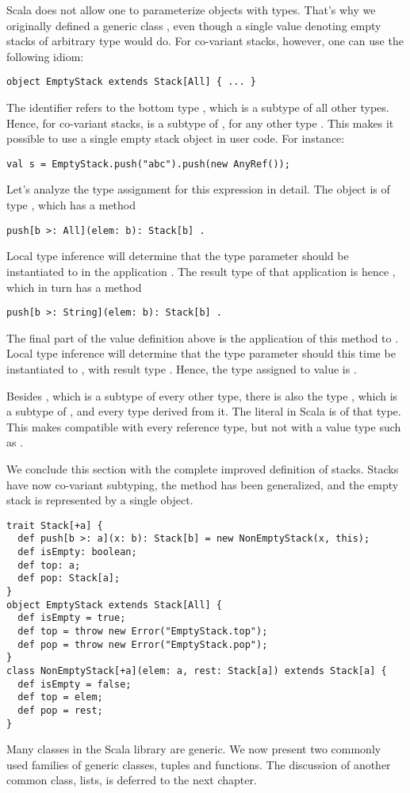 Scala does not allow one to parameterize objects with types. That's
why we originally defined a generic class , even
though a single value denoting empty stacks of arbitrary type would
do. For co-variant stacks, however, one can use the following idiom:
\begin{lstlisting}
object EmptyStack extends Stack[All] { ... }
\end{lstlisting}
The identifier  refers to the bottom type ,
which is a subtype of all other types. Hence, for co-variant stacks,
 is a subtype of , for any other type
. This makes it possible to use a single empty stack object
in user code. For instance:
\begin{lstlisting}
val s = EmptyStack.push("abc").push(new AnyRef());
\end{lstlisting}
Let's analyze the type assignment for this expression in detail.  The
 object is of type , which has a
method
\begin{lstlisting}
push[b >: All](elem: b): Stack[b] .
\end{lstlisting}
Local type inference will determine that the type parameter 
should be instantiated to  in the application 
. The result type of that application is hence
, which in turn has a method
\begin{lstlisting}
push[b >: String](elem: b): Stack[b] .
\end{lstlisting}
The final part of the value definition above is the application of
this method to . Local type inference will
determine that the type parameter  should this time be
instantiated to , with result type .
Hence, the type assigned to value  is .

Besides , which is a subtype of every other type,
there is also the type , which is a subtype of
, and every type derived from it. The 
literal in Scala is of that type. This makes  compatible
with every reference type, but not with a value type such as
.

We conclude this section with the complete improved definition of
stacks. Stacks have now co-variant subtyping, the  method
has been generalized, and the empty stack is represented by a single
object.
\begin{lstlisting}
trait Stack[+a] {
  def push[b >: a](x: b): Stack[b] = new NonEmptyStack(x, this);
  def isEmpty: boolean;
  def top: a;
  def pop: Stack[a];
}
object EmptyStack extends Stack[All] {
  def isEmpty = true;
  def top = throw new Error("EmptyStack.top");
  def pop = throw new Error("EmptyStack.pop");
}
class NonEmptyStack[+a](elem: a, rest: Stack[a]) extends Stack[a] {
  def isEmpty = false;
  def top = elem;
  def pop = rest;
}
\end{lstlisting}
Many classes in the Scala library are generic. We now present two
commonly used families of generic classes, tuples and functions. The
discussion of another common class, lists, is deferred to the next
chapter.

